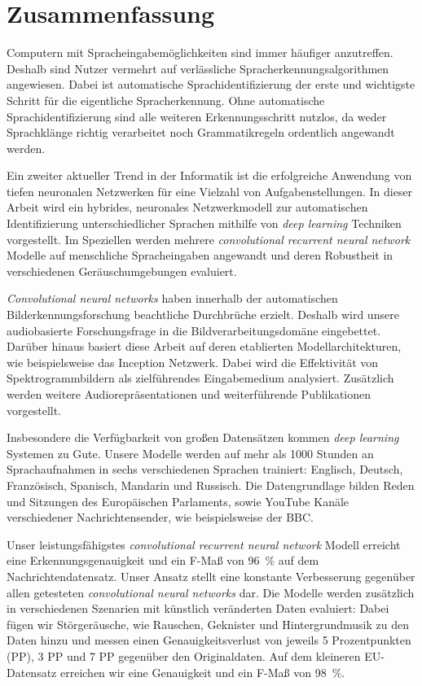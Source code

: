 \section*{\LARGE Zusammenfassung}
Computern mit Spracheingabem\"oglichkeiten sind immer h\"aufiger anzutreffen. Deshalb sind Nutzer vermehrt auf verl\"assliche Spracherkennungsalgorithmen angewiesen. Dabei ist automatische Sprachidentifizierung der erste und wichtigste Schritt f\"ur die eigentliche Spracherkennung. Ohne automatische Sprachidentifizierung sind alle weiteren Erkennungsschritt nutzlos, da weder Sprachkl\"ange richtig verarbeitet noch Grammatikregeln ordentlich angewandt werden.

Ein zweiter aktueller Trend in der Informatik ist die erfolgreiche Anwendung von tiefen neuronalen Netzwerken f\"ur eine Vielzahl von Aufgabenstellungen. In dieser Arbeit wird ein hybrides, neuronales Netzwerkmodell zur automatischen Identifizierung unterschiedlicher Sprachen mithilfe von \emph{deep learning} Techniken vorgestellt. Im Speziellen werden mehrere \emph{convolutional recurrent neural network} Modelle auf menschliche Spracheingaben angewandt und deren Robustheit in verschiedenen Ger\"auschumgebungen evaluiert.

\emph{Convolutional neural networks} haben innerhalb der automatischen Bilderkennungsforschung beachtliche Durchbr\"uche erzielt. Deshalb wird unsere audiobasierte Forschungsfrage in die Bildverarbeitungsdom\"ane eingebettet. Dar\"uber hinaus basiert diese Arbeit auf deren etablierten Modellarchitekturen, wie beispielsweise das Inception Netzwerk\cite{szegedy2015going}. Dabei wird die Effektivit\"at von Spektrogrammbildern als zielf\"uhrendes Eingabemedium analysiert. Zus\"atzlich werden weitere Audiorepr\"asentationen und weiterf\"uhrende Publikationen vorgestellt.

Insbesondere die Verf\"ugbarkeit von gro{\ss}en Datens\"atzen kommen \emph{deep learning} Systemen zu Gute. Unsere Modelle werden auf mehr als \num{1000} Stunden an Sprachaufnahmen in sechs verschiedenen Sprachen trainiert: Englisch, Deutsch, Franz\"osisch, Spanisch, Mandarin und Russisch. Die Datengrundlage bilden Reden und Sitzungen des Europ\"aischen Parlaments, sowie YouTube Kan\"ale verschiedener Nachrichtensender, wie beispielsweise der BBC.

Unser leistungsf\"ahigstes \emph{convolutional recurrent neural network} Modell erreicht eine Erkennungsgenauigkeit und ein F-Ma{\ss} von \SI{96}{\percent} auf dem Nachrichtendatensatz. Unser Ansatz stellt eine konstante Verbesserung gegen\"uber allen getesteten \emph{convolutional neural networks} dar. Die Modelle werden zus\"atzlich in verschiedenen Szenarien mit k\"unstlich ver\"anderten Daten evaluiert: Dabei f\"ugen wir St\"orger\"ausche, wie Rauschen, Geknister und Hintergrundmusik zu den Daten hinzu und messen einen Genauigkeitsverlust von jeweils 5 Prozentpunkten (PP), 3 PP und 7 PP gegen\"uber den Originaldaten. Auf dem kleineren EU-Datensatz erreichen wir eine Genauigkeit und ein F-Ma{\ss} von \SI{98}{\percent}.
